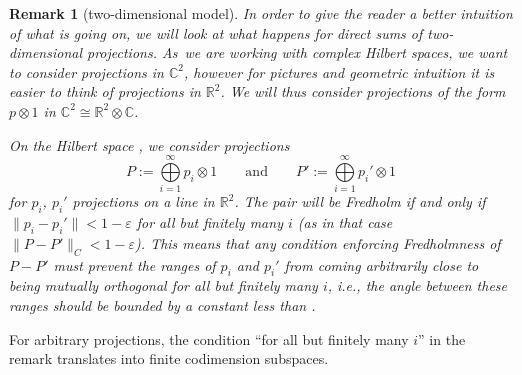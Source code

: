 \documentclass[pdftex]{sigma}
\numberwithin{equation}{section}
\newtheorem{Remark}[Theorem]{Remark} }
\begin{document}
	\begin{Remark}[two-dimensional model]
In order to give the reader a better intuition of what is going on, we will look at what happens for direct sums of two-dimensional projections. As~we are working with complex Hilbert spaces, we want to consider projections in $\mathbb{C}^2$, however for pictures and geometric intuition it is easier to think of projections in $\mathbb{R}^2$. We will thus consider projections of the form $p\otimes 1$ in $\mathbb{C}^2\cong \mathbb{R}^2\otimes \mathbb{C}$.

		On the Hilbert space , we consider projections
\[
P:=\bigoplus\limits_{i=1}^\infty p_i\otimes 1
\qquad \text{and}\qquad
P':=\bigoplus\limits_{i=1}^\infty p_i'\otimes 1
\]
for $p_i$, $p_i'$ projections on a line in $\mathbb{R}^2$. The pair will be Fredholm if and only if
$
\bigl\|p_i-p_i'\bigr\|<1-\varepsilon$
for all but finitely many $i$ (as in that case $\|P-P'\|_C<1-\varepsilon$).		
		This means that any condition enforcing Fredholmness of $P-P'$ must prevent the ranges of $p_i$ and $p_i'$ from coming arbitrarily close to being mutually orthogonal for all but finitely many $i$, i.e., the angle  between these ranges should be bounded by a constant less than .
	\end{Remark}
\medskip
	For arbitrary projections, the condition ``for all but finitely many $i$'' in the remark translates into finite codimension subspaces.
	
\end{document}

